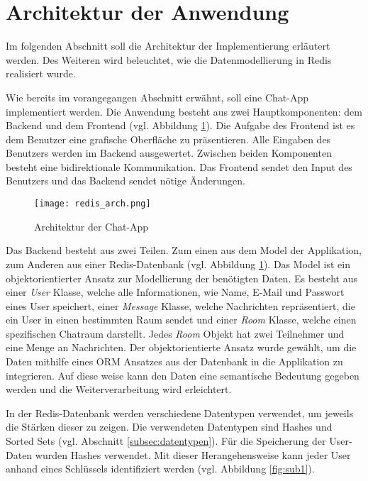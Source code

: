 
\section{Architektur der Anwendung}
Im folgenden Abschnitt soll die Architektur der Implementierung erläutert werden. Des Weiteren wird beleuchtet, wie die Datenmodellierung in \acs{Redis} realisiert wurde.

Wie bereits im vorangegangen Abschnitt erwähnt, soll eine Chat-App implementiert werden. Die Anwendung besteht aus zwei Hauptkomponenten: dem Backend und dem Frontend (vgl. Abbildung \ref{fig:arch}). Die Aufgabe des Frontend ist es dem Benutzer eine grafische Oberfläche zu präsentieren. Alle Eingaben des Benutzers werden im Backend ausgewertet. Zwischen beiden Komponenten besteht eine bidirektionale Kommunikation. Das Frontend sendet den Input des Benutzers und das Backend sendet nötige Änderungen.
\begin{figure}[h]
	\centering
	\texttt{[image: redis\_arch.png]}
	\caption{Architektur der Chat-App}
	\label{fig:arch}
\end{figure}

Das Backend besteht aus zwei Teilen. Zum einen aus dem Model der Applikation, zum Anderen aus einer \acs{Redis}-Datenbank (vgl. Abbildung \ref{fig:arch}). Das Model ist ein objektorientierter Ansatz zur Modellierung der benötigten Daten. Es besteht aus einer \textit{User} Klasse, welche alle Informationen, wie Name, E-Mail und Passwort eines User speichert, einer \textit{Message} Klasse, welche Nachrichten repräsentiert, die ein User in einen bestimmten Raum sendet und einer \textit{Room} Klasse, welche einen spezifischen Chatraum darstellt. Jedes \textit{Room} Objekt hat zwei Teilnehmer und eine Menge an Nachrichten. Der objektorientierte Ansatz wurde gewählt, um die Daten mithilfe eines \acs{ORM} Ansatzes aus der Datenbank in die Applikation zu integrieren. Auf diese weise kann den Daten eine semantische Bedeutung gegeben werden und die Weiterverarbeitung wird erleichtert.

In der \acs{Redis}-Datenbank werden verschiedene Datentypen verwendet, um jeweils die Stärken dieser zu zeigen. Die verwendeten Datentypen sind Hashes und Sorted Sets (vgl. Abschnitt \ref{subsec:datentypen}). Für die Speicherung der User-Daten wurden Hashes verwendet. Mit dieser Herangehensweise kann jeder User anhand eines Schlüssels identifiziert werden (vgl. Abbildung \ref{fig:sub1}).

